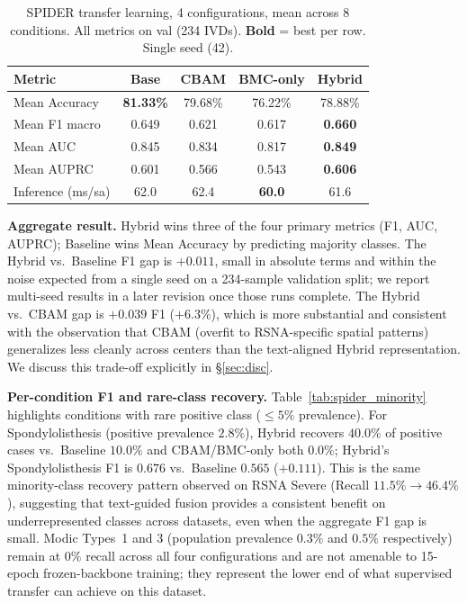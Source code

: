 \documentclass[conference]{IEEEtran}
\newcommand{\best}[1]{\textcolor{best}{\textbf{#1}}}
\begin{document}
\begin{table}[t]
\centering
\caption{SPIDER transfer learning, 4 configurations, mean across 8
conditions. All metrics on val (234 IVDs). \textbf{Bold} = best per
row. Single seed (42).}
\label{tab:spider_transfer_agg}
\renewcommand{\arraystretch}{1.05}
\begin{tabular}{@{}lcccc@{}}
\toprule
Metric & Base & CBAM & BMC-only & \best{Hybrid} \\
\midrule
Mean Accuracy   & \best{81.33\%} & 79.68\% & 76.22\% & 78.88\% \\
Mean F1 macro   & 0.649          & 0.621   & 0.617   & \best{0.660} \\
Mean AUC        & 0.845          & 0.834   & 0.817   & \best{0.849} \\
Mean AUPRC      & 0.601          & 0.566   & 0.543   & \best{0.606} \\
\midrule
Inference (ms/sa) & 62.0         & 62.4    & \best{60.0} & 61.6 \\
\bottomrule
\end{tabular}
\end{table}

\textbf{Aggregate result.} Hybrid wins three of the four primary
metrics (F1, AUC, AUPRC); Baseline wins Mean Accuracy by predicting
majority classes. The Hybrid vs.\ Baseline F1 gap is $+0.011$, small
in absolute terms and within the noise expected from a single seed
on a 234-sample validation split; we report multi-seed results in a
later revision once those runs complete. The Hybrid vs.\ CBAM gap is
$+0.039$ F1 ($+6.3\%$), which is more substantial and consistent
with the observation that CBAM (overfit to RSNA-specific spatial
patterns) generalizes less cleanly across centers than the
text-aligned Hybrid representation. We discuss this trade-off
explicitly in \S\ref{sec:disc}.

\textbf{Per-condition F1 and rare-class recovery.}
Table~\ref{tab:spider_minority} highlights conditions with rare
positive class ($\leq 5\%$ prevalence). For Spondylolisthesis
(positive prevalence $2.8\%$), Hybrid recovers $40.0\%$ of positive
cases vs.\ Baseline $10.0\%$ and CBAM/BMC-only both $0.0\%$;
Hybrid's Spondylolisthesis F1 is $0.676$ vs.\ Baseline $0.565$
($+0.111$). This is the same minority-class recovery pattern
observed on RSNA Severe (Recall $11.5\% \to 46.4\%$), suggesting
that text-guided fusion provides a consistent benefit on
underrepresented classes across datasets, even when the aggregate F1
gap is small. Modic Types~1 and 3 (population prevalence
$0.3\%$ and $0.5\%$ respectively) remain at $0\%$ recall across all
four configurations and are not amenable to 15-epoch frozen-backbone
training; they represent the lower end of what supervised transfer
can achieve on this dataset.
\end{document}

